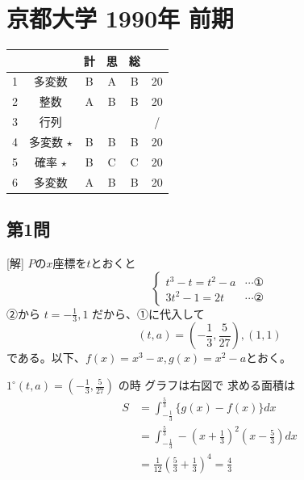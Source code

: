 \documentclass[../main.tex]{subfiles}
\begin{document}
\section*{京都大学 1990年 前期}

\begin{center}
  \begin{tabular}{|c|c|c|c|c|c|}
    \hline
    \multicolumn{2}{|c|}{} & 計 & 思 & 総 & \\
    \hline
    1 & 多変数 & B & A & B & 20 \\
    \hline
    2 & 整数 & A & B & B & 20 \\
    \hline
    3 & 行列 & & & & / \\
    \hline
    4 & 多変数 $\star$ & B & B & B & 20 \\
    \hline
    5 & 確率 $\star$ & B & C & C & 20 \\
    \hline
    6 & 多変数 & A & B & B & 20 \\
    \hline
  \end{tabular}
\end{center}

\subsection*{第1問}
[解] $P$の$x$座標を$t$とおくと
$$
\begin{cases}
  t^3-t=t^2-a & \cdots \text{①} \\
  3t^2-1=2t & \cdots \text{②}
\end{cases}
$$
②から $t=-\frac{1}{3}, 1$ だから、①に代入して
$$ (t, a) = \left(-\frac{1}{3}, \frac{5}{27}\right), (1, 1) $$
である。以下、$f(x)=x^3-x, g(x)=x^2-a$とおく。

$1^{\circ} (t,a) = \left(-\frac{1}{3}, \frac{5}{27}\right)$ の時
グラフは右図で
求める面積は
\begin{align*}
  S &= \int_{-\frac{1}{3}}^{\frac{5}{3}} \{g(x)-f(x)\} dx \\
  &= \int_{-\frac{1}{3}}^{\frac{5}{3}} -\left(x+\frac{1}{3}\right)^2\left(x-\frac{5}{3}\right) dx \\
  &= \frac{1}{12} \left(\frac{5}{3}+\frac{1}{3}\right)^4 = \frac{4}{3}
\end{align*}

\begin{center}
\end{center}
\end{document}
